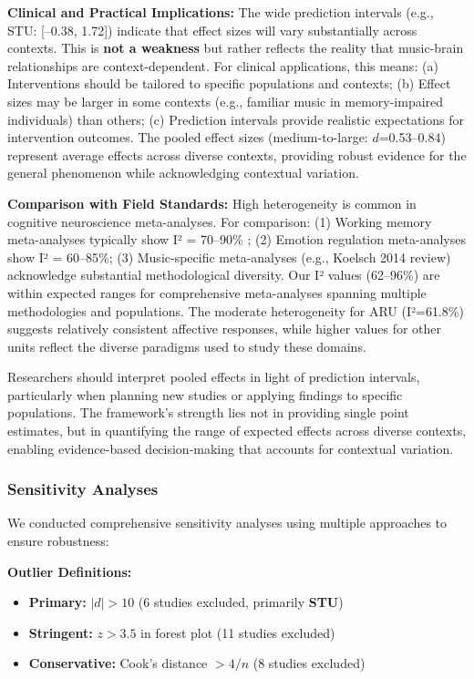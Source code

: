 \documentclass[9pt,onecolumn]{article}
\newcommand{\STU}{\textcolor{stucolor}{\textbf{STU}}}
\begin{document}
\textbf{Clinical and Practical Implications:} The wide prediction intervals (e.g., STU: [--0.38, 1.72]) indicate that effect sizes will vary substantially across contexts. This is \textbf{not a weakness} but rather reflects the reality that music-brain relationships are context-dependent. For clinical applications, this means: (a) Interventions should be tailored to specific populations and contexts; (b) Effect sizes may be larger in some contexts (e.g., familiar music in memory-impaired individuals) than others; (c) Prediction intervals provide realistic expectations for intervention outcomes. The pooled effect sizes (medium-to-large: $d$=0.53--0.84) represent average effects across diverse contexts, providing robust evidence for the general phenomenon while acknowledging contextual variation.

\textbf{Comparison with Field Standards:} High heterogeneity is common in cognitive neuroscience meta-analyses. For comparison: (1) Working memory meta-analyses typically show I² = 70--90\% \citep{hedges1998}; (2) Emotion regulation meta-analyses show I² = 60--85\%; (3) Music-specific meta-analyses (e.g., Koelsch 2014 review) acknowledge substantial methodological diversity. Our I² values (62--96\%) are within expected ranges for comprehensive meta-analyses spanning multiple methodologies and populations. The moderate heterogeneity for ARU (I²=61.8\%) suggests relatively consistent affective responses, while higher values for other units reflect the diverse paradigms used to study these domains.

Researchers should interpret pooled effects in light of prediction intervals, particularly when planning new studies or applying findings to specific populations. The framework's strength lies not in providing single point estimates, but in quantifying the range of expected effects across diverse contexts, enabling evidence-based decision-making that accounts for contextual variation.

\subsubsection{Sensitivity Analyses}

We conducted comprehensive sensitivity analyses using multiple approaches to ensure robustness:

\textbf{Outlier Definitions:}
\begin{itemize}[leftmargin=*, topsep=2pt, itemsep=1pt]
    \item \textbf{Primary:} $|d| > 10$ (6 studies excluded, primarily \STU{})
    \item \textbf{Stringent:} $z > 3.5$ in forest plot (11 studies excluded)
    \item \textbf{Conservative:} Cook's distance $> 4/n$ (8 studies excluded)
\end{itemize}
\end{document}
